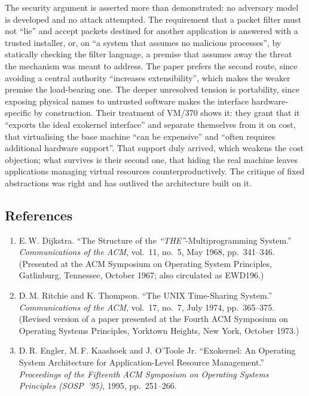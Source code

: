 The security argument is asserted more than demonstrated: no adversary model is developed
and no attack attempted. The requirement that a packet filter must not ``lie'' and accept
packets destined for another application is answered with a trusted installer, or, on ``a
system that assumes no malicious processes'', by statically checking the filter language,
a premise that assumes away the threat the mechanism was meant to address. The paper
prefers the second route, since avoiding a central authority ``increases extensibility'',
which makes the weaker premise the load-bearing one. The
deeper unresolved tension is portability, since exposing physical names to untrusted
software makes the interface hardware-specific by construction. Their treatment of VM/370
shows it: they grant that it ``exports the ideal exokernel interface'' and separate
themselves from it on cost, that virtualising the base machine ``can be expensive'' and
``often requires additional hardware support''. That support duly arrived, which weakens
the cost objection; what survives is their second one, that hiding the real machine leaves
applications managing virtual resources counterproductively. The critique of fixed
abstractions was right and has outlived the architecture built on it.


\subsection*{References}
\label{p3:sec:refs}

\begin{enumerate}
\item[{[1-10]}] E.\,W. Dijkstra. ``The Structure of the \textit{``THE''}-Multiprogramming
  System.'' \emph{Communications of the ACM}, vol.~11, no.~5, May 1968, pp.~341--346.
  (Presented at the ACM Symposium on Operating System Principles, Gatlinburg, Tennessee,
  October 1967; also circulated as EWD196.)
\item[{[1-2]}] D.\,M. Ritchie and K. Thompson. ``The UNIX Time-Sharing System.''
  \emph{Communications of the ACM}, vol.~17, no.~7, July 1974, pp.~365--375. (Revised version
  of a paper presented at the Fourth ACM Symposium on Operating Systems Principles, Yorktown
  Heights, New York, October 1973.)
\item[{[1-3]}] D.\,R. Engler, M.\,F. Kaashoek and J. O'Toole Jr. ``Exokernel: An Operating
  System Architecture for Application-Level Resource Management.'' \emph{Proceedings of the
  Fifteenth ACM Symposium on Operating Systems Principles (SOSP~'95)}, 1995, pp.~251--266.
\end{enumerate}
